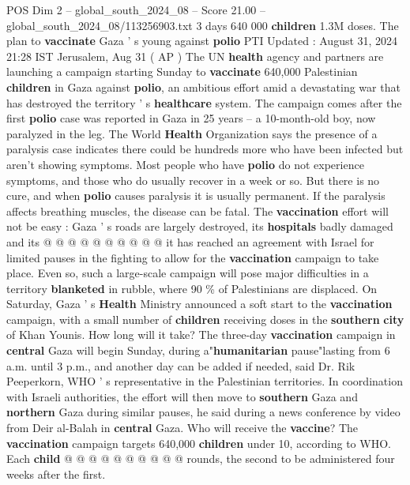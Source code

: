 \begin{textsample}{POS Dim 2 – global\_south\_2024\_08 – Score 21.00 – global\_south\_2024\_08/113256903.txt}  \label{ex:f2_pos_336}
3 days 640 000 \textbf{children} 1.3M doses.
The plan to \textbf{vaccinate} Gaza ' s young against \textbf{polio} PTI Updated : August 31, 2024 21:28 IST Jerusalem, Aug 31 ( AP ) The UN \textbf{health} agency and partners are launching a campaign starting Sunday to \textbf{vaccinate} 640,000 Palestinian \textbf{children} in Gaza against \textbf{polio}, an ambitious effort amid a devastating war that has destroyed the territory ' s \textbf{healthcare} system.
The campaign comes after the first \textbf{polio} case was reported in Gaza in 25 years -- a 10-month-old boy, now paralyzed in the leg.
The World \textbf{Health} Organization says the presence of a paralysis case indicates there could be hundreds more who have been infected but aren't showing symptoms.
Most people who have \textbf{polio} do not experience symptoms, and those who do usually recover in a week or so.
But there is no cure, and when \textbf{polio} causes paralysis it is usually permanent.
If the paralysis affects breathing muscles, the disease can be fatal.
The \textbf{vaccination} effort will not be easy : Gaza ' s roads are largely destroyed, its \textbf{hospitals} badly damaged and its @ @ @ @ @ @ @ @ @ @ it has reached an agreement with Israel for limited pauses in the fighting to allow for the \textbf{vaccination} campaign to take place.
Even so, such a large-scale campaign will pose major difficulties in a territory \textbf{blanketed} in rubble, where 90 \% of Palestinians are displaced.
On Saturday, Gaza ' s \textbf{Health} Ministry announced a soft start to the \textbf{vaccination} campaign, with a small number of \textbf{children} receiving doses in the \textbf{southern} \textbf{city} of Khan Younis.
How long will it take?
The three-day \textbf{vaccination} campaign in \textbf{central} Gaza will begin Sunday, during a"\textbf{humanitarian} pause"lasting from 6 a.m. until 3 p.m., and another day can be added if needed, said Dr.
Rik Peeperkorn, WHO ' s representative in the Palestinian territories.
In coordination with Israeli authorities, the effort will then move to \textbf{southern} Gaza and \textbf{northern} Gaza during similar pauses, he said during a news conference by video from Deir al-Balah in \textbf{central} Gaza.
Who will receive the \textbf{vaccine}?
The \textbf{vaccination} campaign targets 640,000 \textbf{children} under 10, according to WHO.
Each \textbf{child} @ @ @ @ @ @ @ @ @ @ rounds, the second to be administered four weeks after the first.

\end{textsample}
